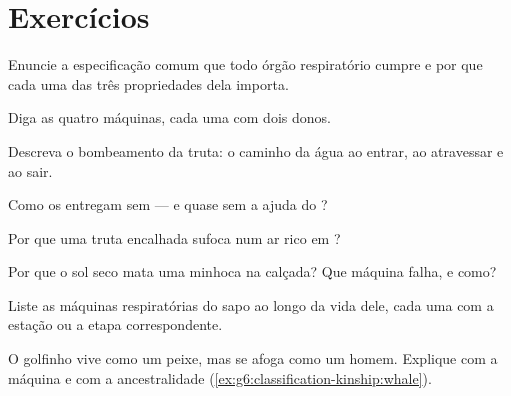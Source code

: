\section{Exercícios}

\begin{exercise}[$\star$]\label{exo:g7:how-animals-breathe:1}
Enuncie a especificação comum que todo órgão respiratório cumpre e por
que cada uma das três propriedades dela importa.
\end{exercise}

\begin{exercise}[$\star$]\label{exo:g7:how-animals-breathe:2}
Diga as quatro máquinas, cada uma com dois donos.
\end{exercise}

\begin{exercise}[$\star$]\label{exo:g7:how-animals-breathe:3}
Descreva o bombeamento da truta: o caminho da água ao entrar, ao
atravessar e ao sair.
\end{exercise}

\begin{exercise}[$\star$]\label{exo:g7:how-animals-breathe:4}
Como os  entregam  sem  --- e quase sem a ajuda
do ?
\end{exercise}

\begin{exercise}[$\star$]\label{exo:g7:how-animals-breathe:5}
Por que uma truta encalhada sufoca num ar rico em ?
\end{exercise}

\begin{exercise}[$\star$]\label{exo:g7:how-animals-breathe:6}
Por que o sol seco mata uma minhoca na calçada? Que máquina falha, e
como?
\end{exercise}

\begin{exercise}[$\star\star$]\label{exo:g7:how-animals-breathe:7}
Liste as máquinas respiratórias do sapo ao longo da vida dele, cada
uma com a estação ou a etapa correspondente.
\end{exercise}

\begin{exercise}[$\star\star$]\label{exo:g7:how-animals-breathe:8}
O golfinho vive como um peixe, mas se afoga como um homem. Explique
com a máquina e com a ancestralidade
(\cref{ex:g6:classification-kinship:whale}).
\end{exercise}

